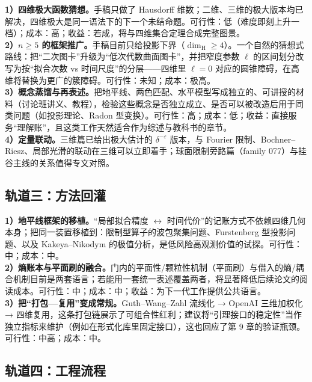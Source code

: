 \begin{dirbox}[数学推进轨道]
\textbf{1）四维极大函数猜想。}手稿只做了 Hausdorff 维数；二维、三维的极大版本均已解决，四维极大是同一语法下的下一个未结命题。可行性：低（难度即刻上升一档）；成本：高；收益：若成，将与四维集合定理合成完整图景。\\
\textbf{2）$n\ge 5$ 的框架推广。}手稿目前只给投影下界（$\dim_{\mathrm{H}}\ge 4$）。一个自然的猜想式路线：把“二次图卡”升级为“低次代数曲面图卡”，并把窄度参数 $\ell$ 的区间划分改写为按“拟合次数 vs 时间尺度”的分层——四维里 $\ell=0$ 对应的圆锥障碍，在高维将替换为更广的簇障碍。可行性：未知；成本：极高。\\
\textbf{3）概念蒸馏与再表述。}把地平线、两色匹配、水平模型写成独立的、可讲授的材料（讨论班讲义、教程），检验这些概念是否独立成立、是否可以被改造后用于同类问题（如投影理论、Radon 型变换）。可行性：高；成本：低；收益：直接服务“理解账”，且这类工作天然适合作为综述与教科书的章节。\\
\textbf{4）定量联动。}三维篇已给出极大估计的 $\delta^{-\varepsilon}$ 版本，与 Fourier 限制、Bochner--Riesz、局部光滑的联动在三维可以立即着手；球面限制旁路篇（family 077）与挂谷主线的关系值得专文对照。
\end{dirbox}

\subsection{轨道三：方法回灌}

\begin{dirbox}[方法回灌轨道]
\textbf{1）地平线框架的移植。}“局部拟合精度 $\leftrightarrow$ 时间代价”的记账方式不依赖四维几何本身；把同一装置移植到：限制型算子的波包聚集问题、Furstenberg 型投影问题、以及 Kakeya--Nikodym 的极值分析，是低风险高观测价值的试探。可行性：中；成本：中。\\
\textbf{2）熵账本与平面刷的融合。}门内的平面性/颗粒性机制（平面刷）与借入的熵/耦合机制目前是两套语言；若能用一套统一表述覆盖两者，将显著降低后续论文的阅读成本。可行性：中；成本：中；收益：为下一代工作提供公共语言。\\
\textbf{3）把“打包—复用”变成常规。}Guth--Wang--Zahl 流线化 → OpenAI 三维加权化 → 四维复用，这条打包链展示了可组合性红利；建议将“引理接口的稳定性”当作独立指标来维护（例如在形式化库里固定接口），这也回应了第 9 章的验证瓶颈。可行性：中高；成本：中。
\end{dirbox}

\subsection{轨道四：工程流程}

